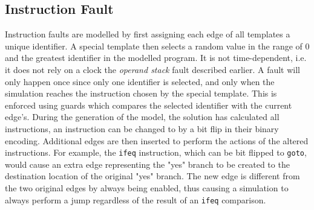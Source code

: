 \subsection{Instruction Fault}
Instruction faults are modelled by first assigning each edge of all templates a unique identifier. A special template then selects a random value in the range of $0$ and the greatest identifier in the modelled program. It is not time-dependent, i.e. it does not rely on a clock the \textit{operand stack} fault described earlier. A fault will only happen once since only one identifier is selected, and only when the simulation reaches the instruction chosen by the special template. This is enforced using guards which compares the selected identifier with the current edge's. During the generation of the model, the solution has calculated all instructions, an instruction can be changed to by a bit flip in their binary encoding. Additional edges are then inserted to perform the actions of the altered instructions. For example, the \texttt{ifeq} instruction, which can be bit flipped to \texttt{goto}, would cause an extra edge representing the "yes" branch to be created to the destination location of the original "yes" branch. The new edge is different from the two original edges by always being enabled, thus causing a simulation to always perform a jump regardless of the result of an \texttt{ifeq} comparison.